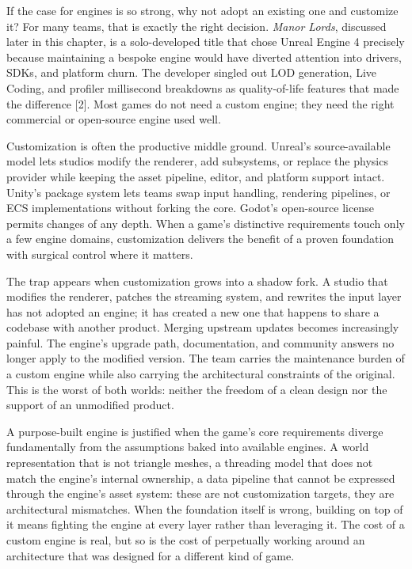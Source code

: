 \documentclass[
  11pt,
  letterpaper,
  DIV=11,
  numbers=noendperiod,
  twoside,
  open=right]{scrreprt}
\begin{document}
If the case for engines is so strong, why not adopt an existing one and
customize it? For many teams, that is exactly the right decision.
\emph{Manor Lords}, discussed later in this chapter, is a solo-developed
title that chose Unreal Engine 4 precisely because maintaining a bespoke
engine would have diverted attention into drivers, SDKs, and platform
churn. The developer singled out LOD generation, Live Coding, and
profiler millisecond breakdowns as quality-of-life features that made
the difference {[}2{]}. Most games do not need a custom engine; they
need the right commercial or open-source engine used well.

Customization is often the productive middle ground. Unreal's
source-available model lets studios modify the renderer, add subsystems,
or replace the physics provider while keeping the asset pipeline,
editor, and platform support intact. Unity's package system lets teams
swap input handling, rendering pipelines, or ECS implementations without
forking the core. Godot's open-source license permits changes of any
depth. When a game's distinctive requirements touch only a few engine
domains, customization delivers the benefit of a proven foundation with
surgical control where it matters.

The trap appears when customization grows into a shadow fork. A studio
that modifies the renderer, patches the streaming system, and rewrites
the input layer has not adopted an engine; it has created a new one that
happens to share a codebase with another product. Merging upstream
updates becomes increasingly painful. The engine's upgrade path,
documentation, and community answers no longer apply to the modified
version. The team carries the maintenance burden of a custom engine
while also carrying the architectural constraints of the original. This
is the worst of both worlds: neither the freedom of a clean design nor
the support of an unmodified product.

A purpose-built engine is justified when the game's core requirements
diverge fundamentally from the assumptions baked into available engines.
A world representation that is not triangle meshes, a threading model
that does not match the engine's internal ownership, a data pipeline
that cannot be expressed through the engine's asset system: these are
not customization targets, they are architectural mismatches. When the
foundation itself is wrong, building on top of it means fighting the
engine at every layer rather than leveraging it. The cost of a custom
engine is real, but so is the cost of perpetually working around an
architecture that was designed for a different kind of game.
\end{document}
